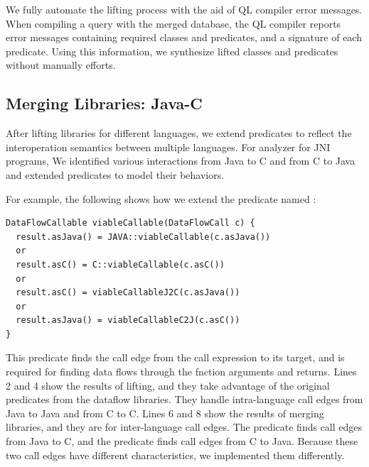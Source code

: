 We fully automate the lifting process with the aid of QL compiler error
messages. When compiling a query with the merged database, the QL compiler
reports error messages containing required classes and predicates, and a
signature of each predicate. Using this information, we synthesize lifted
classes and predicates without manually efforts.


\subsection{Merging Libraries: Java-C}\label{sec:merging}
After lifting libraries for different languages, we extend predicates to
reflect the interoperation semantics between multiple languages.
For analyzer for JNI programs, We identified various interactions from Java to C and from C to Java
and extended predicates to model their behaviors.

For example, the following shows how we extend the predicate
named :
\begin{lstlisting}[style=codeql,xleftmargin=2.5em]
DataFlowCallable viableCallable(DataFlowCall c) {
  result.asJava() = JAVA::viableCallable(c.asJava())
  or
  result.asC() = C::viableCallable(c.asC())
  or
  result.asC() = viableCallableJ2C(c.asJava())
  or
  result.asJava() = viableCallableC2J(c.asC())
}
\end{lstlisting}
This predicate finds the call edge from the call expression to its
target, and is required for finding data flows through the fnction arguments and returns.
Lines 2 and 4 show the results of lifting, and they take advantage of the
original predicates from the dataflow libraries.  They handle
intra-language call edges from Java to Java and from C to C.
Lines 6 and 8 show the results of merging libraries, and they are
for inter-language call edges.  The predicate  finds call edges
from Java to C, and the predicate  finds call edges from
C to Java. Because these two call edges have different characteristics, we
implemented them differently.

